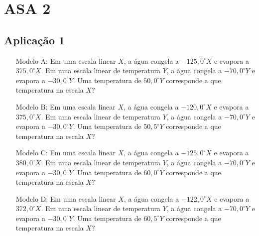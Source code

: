 \chapter{ASA 2} \label{apendice:asa2}
\section{Aplicação 1} \label{ch:ASA2a1}

\begin{itemize}
    \item[Modelo A:] Em uma escala linear $X$, a água congela a $-125,0^{\circ}X$ e evapora a $375,0^{\circ}X$. Em uma escala linear de temperatura $Y$, a água congela a $-70,0^{\circ}Y$ e evapora a $-30,0^{\circ}Y$. Uma temperatura de $50,0^{\circ}Y$ corresponde a que temperatura na escala $X$?    

    \item[Modelo B:] Em uma escala linear $X$, a água congela a $-120,0^{\circ}X$ e evapora a $375,0^{\circ}X$. Em uma escala linear de temperatura $Y$, a água congela a $-70,0^{\circ}Y$ e evapora a $-30,0^{\circ}Y$. Uma temperatura de $50,5^{\circ}Y$ corresponde a que temperatura na escala $X$? 
   
    \item[Modelo C:] Em uma escala linear $X$, a água congela a $-125,0^{\circ}X$ e evapora a $380,0^{\circ}X$. Em uma escala linear de temperatura $Y$, a água congela a $-70,0^{\circ}Y$ e evapora a $-30,0^{\circ}Y$. Uma temperatura de $60,0^{\circ}Y$ corresponde a que temperatura na escala $X$? 
    
    \item[Modelo D:] Em uma escala linear $X$, a água congela a $-122,0^{\circ}X$ e evapora a $372,0^{\circ}X$. Em uma escala linear de temperatura $Y$, a água congela a $-70,0^{\circ}Y$ e evapora a $-30,0^{\circ}Y$. Uma temperatura de $60,5^{\circ}Y$ corresponde a que temperatura na escala $X$? 

    \end{itemize}
\newpage

